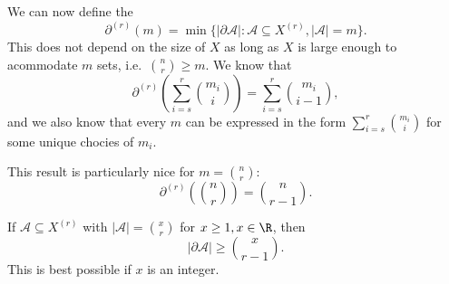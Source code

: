 \documentclass[a4paper]{article}
\begin{document}
We can now define the 
\[
  \partial^{(r)}(m) = \min\{|\partial \mathcal{A}| : \mathcal{A} \subseteq X^{(r)}, |\mathcal{A}| = m\}.
\]
This does not depend on the size of $X$ as long as $X$ is large enough to acommodate $m$ sets, i.e.\ $\binom{n}{r} \geq m$. We know that
\[
  \partial^{(r)}\left( \sum_{i = s}^r \binom{m_i}{i}\right) = \sum_{i = s}^r \binom{m_i}{i - 1},
\]
and we also know that every $m$ can be expressed in the form $\sum_{i = s}^r \binom{m_i}{i}$ for some unique chocies of $m_i$.

This result is particularly nice for $m = \binom{n}{r}$:
\[
  \partial^{(r)}\left(\binom{n}{r}\right) = \binom{n}{r - 1}.
\]
\begin{thm}[Lov\a'ss, 1979] %
  If $\mathcal{A} \subseteq X^{(r)}$ with $|\mathcal{A}| = \binom{x}{r}$ for $x \geq 1, x \in \R$, then
  \[
    |\partial \mathcal{A}| \geq \binom{x}{r - 1}.
  \]
  This is best possible if $x$ is an integer.
\end{thm}
\printindex
\end{document}
